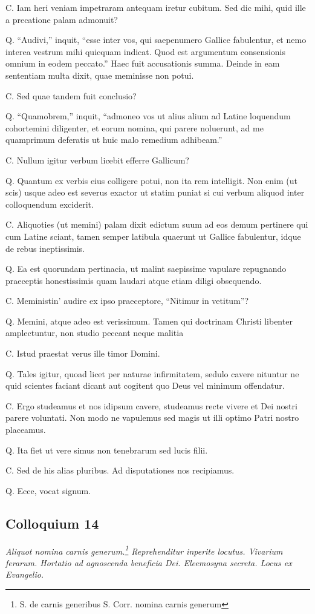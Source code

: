 \documentclass{article}
\begin{document}
C. Iam heri veniam impetraram antequam iretur cubitum. Sed dic mihi, quid ille a precatione palam admonuit?

Q. ``Audivi,'' inquit, ``esse inter vos, qui saepenumero Gallice fabulentur, et nemo interea vestrum mihi quicquam indicat. Quod est argumentum consensionis omnium in eodem peccato.'' Haec fuit accusationis summa. Deinde in eam sententiam multa dixit, quae meminisse non potui.

C. Sed quae tandem fuit conclusio?

Q. ``Quamobrem,'' inquit, ``admoneo vos ut alius alium ad Latine loquendum cohortemini diligenter, et eorum nomina, qui parere noluerunt, ad me quamprimum deferatis ut huic malo remedium adhibeam.''

C. Nullum igitur verbum licebit efferre Gallicum?

Q. Quantum ex verbis eius colligere potui, non ita rem intelligit. Non enim (ut scis) usque adeo est severus exactor ut statim puniat si cui verbum aliquod inter colloquendum exciderit.

C. Aliquoties (ut memini) palam dixit edictum suum ad eos demum pertinere qui cum Latine sciant, tamen semper latibula quaerunt ut Gallice fabulentur, idque de rebus ineptissimis.

Q. Ea est quorundam pertinacia, ut malint saepissime vapulare repugnando praeceptis honestissimis quam laudari atque etiam diligi obsequendo.

C. Meministin’ audire ex ipso praeceptore, ``Nitimur in vetitum''?

Q. Memini, atque adeo est verissimum. Tamen qui doctrinam Christi libenter amplectuntur, non studio peccant neque malitia

C. Istud praestat verus ille timor Domini.

Q. Tales igitur, quoad licet per naturae infirmitatem, sedulo cavere nituntur ne quid scientes faciant dicant aut cogitent quo Deus vel minimum offendatur.

C. Ergo studeamus et nos idipsum cavere, studeamus recte vivere et Dei nostri parere voluntati. Non modo ne vapulemus sed magis ut illi optimo Patri nostro placeamus.

Q. Ita fiet ut vere simus non tenebrarum sed lucis filii.

C. Sed de his alias pluribus. Ad disputationes nos recipiamus.

Q. Ecce, vocat signum.

\subsection{Colloquium 14}
\emph{Aliquot nomina carnis generum.\footnote{S. de carnis generibus S. Corr. nomina carnis generum} Reprehenditur inperite locutus. Vivarium ferarum. Hortatio ad agnoscenda beneficia Dei. Eleemosyna secreta. Locus ex Evangelio.}
\end{document}
